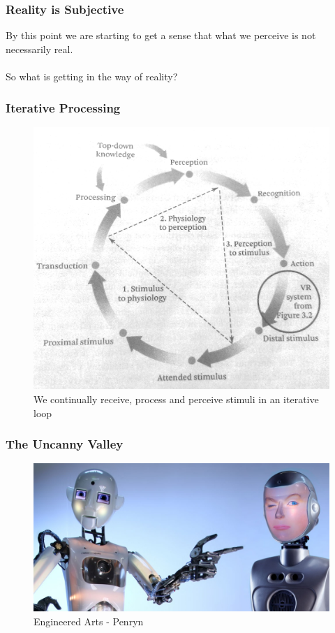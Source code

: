 \begin{frame}
	\frametitle{Reality is Subjective}
	By this point we are starting to get a sense that what we perceive is not necessarily real. \\~\\ \pause
	So what is getting in the way of reality? 
\end{frame}

\begin{frame}
	\frametitle{Iterative Processing}
	\begin{figure}
		 \includegraphics[scale=.1]{assets/iterative}
		 \caption{ We continually receive, process and perceive stimuli in an iterative loop}
		 
	\end{figure}
\end{frame}

\begin{frame}
	\frametitle{The Uncanny Valley}
	\begin{figure}
		 \includegraphics[scale=.3]{assets/bots}  
		 \caption{Engineered Arts - Penryn}
	\end{figure}
\end{frame}

